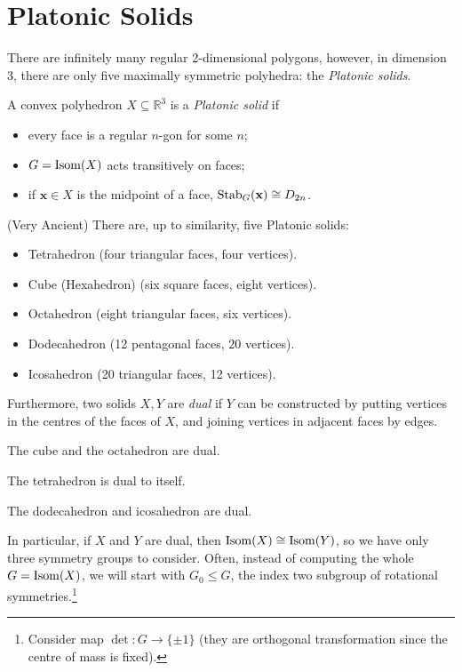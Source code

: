 \documentclass[10pt, a4paper, twoside]{report}
\begin{document}
\section{Platonic Solids}
There are infinitely many regular 2-dimensional polygons, however, in dimension 3, there are only five maximally symmetric polyhedra: the \emph{Platonic solids}.
\begin{definition}
    A convex polyhedron \(X\subseteq\mathbb{R}^3\) is a \emph{Platonic solid} if 
    \begin{itemize}
        \item every face is a regular \(n\)-gon for some \(n\);
        \item \(G=\operatorname{Isom}(X)\) acts transitively on faces;
        \item if \(\mathbf{x}\in X\) is the midpoint of a face, \(\operatorname{Stab}_G(\mathbf{x})\cong D_{2n}\).
    \end{itemize}
\end{definition}
\begin{theorem}
    (Very Ancient) There are, up to similarity, five Platonic solids:
    \begin{itemize}
        \item Tetrahedron (four triangular faces, four vertices).
        \item Cube (Hexahedron) (six square faces, eight vertices).
        \item Octahedron (eight triangular faces, six vertices).
        \item Dodecahedron (12 pentagonal faces, 20 vertices).
        \item Icosahedron (20 triangular faces, 12 vertices).
    \end{itemize}
\end{theorem}
Furthermore, two solids \(X, Y\) are \emph{dual} if \(Y\) can be constructed by putting vertices in the centres of the faces of \(X\), and joining vertices in adjacent faces by edges.
\begin{example}
    The cube and the octahedron are dual.
\end{example}
\begin{example}
    The tetrahedron is dual to itself.
\end{example}
\begin{example}
    The dodecahedron and icosahedron are dual.
\end{example}
In particular, if \(X\) and \(Y\) are dual, then \(\operatorname{Isom}(X)\cong\operatorname{Isom}(Y)\), so we have only three symmetry groups to consider. Often, instead of computing the whole \(G=\operatorname{Isom}(X)\), we will start with \(G_0\leq G\), the index two subgroup of rotational symmetries.\footnote{Consider map \(\det:G\to \{\pm 1\}\) (they are orthogonal transformation since the centre of mass is fixed).}
\end{document}
